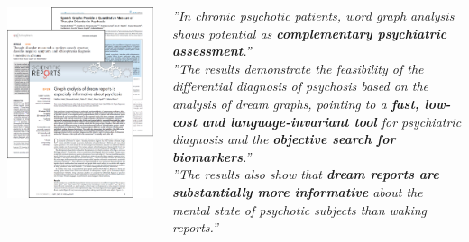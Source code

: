 \begin{minipage}[t]{\textwidth}
    \begin{columns}
        \begin{column}{0.5\textwidth}
            \includegraphics[width=\textwidth]{immagini/articles}
        \end{column}
        \begin{column}{0.5\textwidth}
            \begin{spacing}{0.6}
        {\footnotesize{\textit{''In chronic psychotic patients, word graph analysis shows potential as
            \textbf{complementary psychiatric assessment}.''}}}\\
        \vspace{0.7cm}
        {\footnotesize{\textit{''The results demonstrate the feasibility of the differential
        diagnosis of psychosis based on the analysis of dream graphs, pointing to a \textbf{fast, low-cost and
        language-invariant tool} for psychiatric diagnosis and the \textbf{objective search for biomarkers}.''}}}\\
            \vspace{0.7cm}
        {\footnotesize{\textit{''The results also show that \textbf{dream reports are substantially more
        informative} about the mental state of psychotic subjects than waking reports.''}}}\\
        \end{spacing}
        \end{column}
    \end{columns}
\end{minipage}